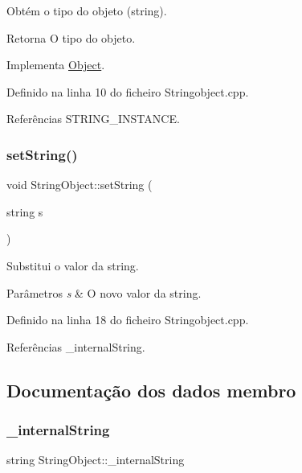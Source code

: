 Obtém o tipo do objeto (string). 

\begin{DoxyReturn}{Retorna}
O tipo do objeto. 
\end{DoxyReturn}


Implementa \hyperlink{classObject_a08cee945bc224fc81f4448086625183d}{Object}.



Definido na linha 10 do ficheiro Stringobject.\+cpp.



Referências S\+T\+R\+I\+N\+G\+\_\+\+I\+N\+S\+T\+A\+N\+CE.

\mbox{\label{classStringObject_a96812d8ef025b1f897b09f816d0297f7}} 
\subsubsection{\texorpdfstring{set\+String()}{setString()}}
{\footnotesize\ttfamily void String\+Object\+::set\+String (\begin{DoxyParamCaption}\item[{string}]{s }\end{DoxyParamCaption})}



Substitui o valor da string. 


\begin{DoxyParams}{Parâmetros}
{\em s} & O novo valor da string. \\
\hline
\end{DoxyParams}


Definido na linha 18 do ficheiro Stringobject.\+cpp.



Referências \+\_\+internal\+String.



\subsection{Documentação dos dados membro}
\mbox{\label{classStringObject_a129b52ebca78da26c58175e45e1869cc}} 
\subsubsection{\texorpdfstring{\+\_\+internal\+String}{\_internalString}}
{\footnotesize\ttfamily string String\+Object\+::\+\_\+internal\+String\hspace{0.3cm}{\ttfamily [private]}}

